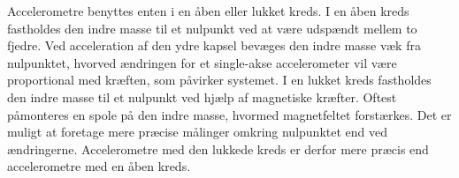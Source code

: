 Accelerometre benyttes enten i en åben eller lukket kreds. I en åben kreds fastholdes den indre masse til et nulpunkt ved at være udspændt mellem to fjedre. Ved acceleration af den ydre kapsel bevæges den indre masse væk fra nulpunktet, hvorved ændringen for et single-akse accelerometer vil være proportional med kræften, som påvirker systemet. \newline
I en lukket kreds fastholdes den indre masse til et nulpunkt ved hjælp af magnetiske kræfter. Oftest påmonteres en spole på den indre masse, hvormed magnetfeltet forstærkes. Det er muligt at foretage mere præcise målinger omkring nulpunktet end ved ændringerne. Accelerometre med den lukkede kreds er derfor mere præcis end accelerometre med en åben kreds. \citep{TittertonWeston2004,Academic2016d,Serway2010}